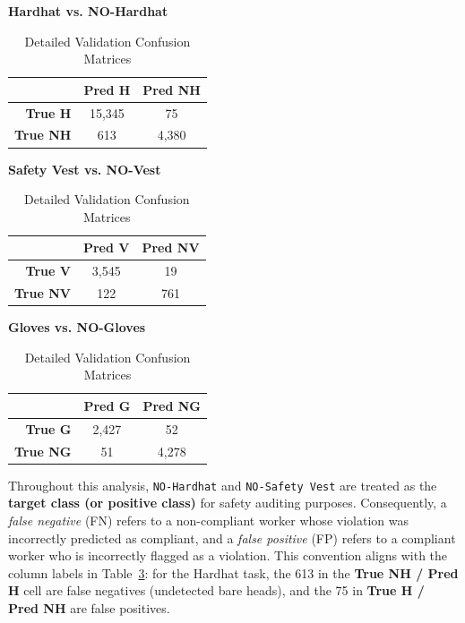 \documentclass[11pt,a4paper]{article}
\begin{document}
\begin{table}[H]
\centering
\caption{Detailed Validation Confusion Matrices}
\label{tab:confusion_matrices_detailed}
\vspace{2mm}
\textbf{Hardhat vs. NO-Hardhat} \\
\vspace{1mm}
\begin{tabular}{r|cc}
\multicolumn{1}{c}{} & \textbf{Pred H} & \textbf{Pred NH} \\ \hline
\textbf{True H}  & 15,345 & 75 \\
\textbf{True NH} & 613 & 4,380 \\
\end{tabular}

\vspace{5mm}
\textbf{Safety Vest vs. NO-Vest} \\
\vspace{1mm}
\begin{tabular}{r|cc}
\multicolumn{1}{c}{} & \textbf{Pred V} & \textbf{Pred NV} \\ \hline
\textbf{True V}  & 3,545 & 19 \\
\textbf{True NV} & 122 & 761 \\
\end{tabular}

\vspace{5mm}
\textbf{Gloves vs. NO-Gloves} \\
\vspace{1mm}
\begin{tabular}{r|cc}
\multicolumn{1}{c}{} & \textbf{Pred G} & \textbf{Pred NG} \\ \hline
\textbf{True G}  & 2,427 & 52 \\
\textbf{True NG} & 51 & 4,278 \\
\end{tabular}
\end{table}

Throughout this analysis, \texttt{NO-Hardhat} and \texttt{NO-Safety Vest} are treated as the \textbf{target class (or positive class)} for safety auditing purposes. Consequently, a \textit{false negative} (FN) refers to a non-compliant worker whose violation was incorrectly predicted as compliant, and a \textit{false positive} (FP) refers to a compliant worker who is incorrectly flagged as a violation. This convention aligns with the column labels in Table~\ref{tab:confusion_matrices_detailed}: for the Hardhat task, the 613 in the \textbf{True NH / Pred H} cell are false negatives (undetected bare heads), and the 75 in \textbf{True H / Pred NH} are false positives.
\end{document}
